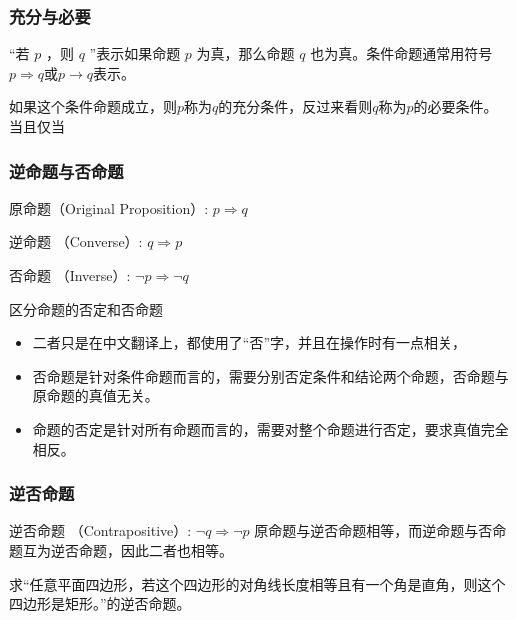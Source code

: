 
\subsubsection{充分与必要}

“若 $p$ ，则 $q$ ”表示如果命题 $p$ 为真，那么命题 $q$ 也为真。条件命题通常用符号$p\Rightarrow q$或$p\rightarrow q$表示。

如果这个条件命题成立，则$p$称为$q$的充分条件，反过来看则$q$称为$p$的必要条件。
当且仅当


\subsubsection{逆命题与否命题}

原命题（Original Proposition）:  $p \Rightarrow q $

逆命题 （Converse）:  $q \Rightarrow p$ 

否命题 （Inverse）:  $\neg p \Rightarrow \neg q $


\begin{example}{区分命题的否定和否命题}
\begin{itemize}
\item 二者只是在中文翻译上，都使用了“否”字，并且在操作时有一点相关，
\item 否命题是针对条件命题而言的，需要分别否定条件和结论两个命题，否命题与原命题的真值无关。
\item 命题的否定是针对所有命题而言的，需要对整个命题进行否定，要求真值完全相反。
\end{itemize}

\end{example}

\subsubsection{逆否命题}

逆否命题 （Contrapositive）:  $\neg q \Rightarrow \neg p $
原命题与逆否命题相等，而逆命题与否命题互为逆否命题，因此二者也相等。



\begin{exercise}{求“任意平面四边形，若这个四边形的对角线长度相等且有一个角是直角，则这个四边形是矩形。”的逆否命题。}
\end{exercise}